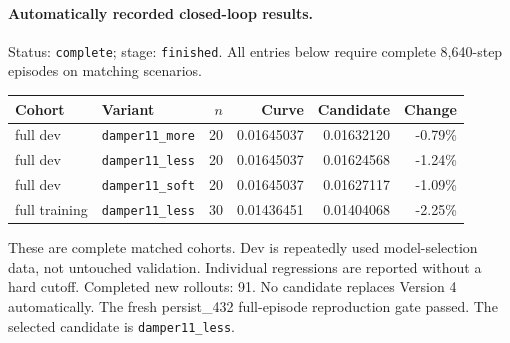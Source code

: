 \paragraph{Automatically recorded closed-loop results.}
Status: \texttt{complete}; stage: \texttt{finished}.
All entries below require complete 8,640-step episodes on matching scenarios.
\begin{center}\small
\begin{tabular}{llrrrr}\toprule
Cohort & Variant & $n$ & Curve & Candidate & Change \\\midrule
full dev & \texttt{damper11\_more} & 20 & 0.01645037 & 0.01632120 & -0.79\% \\
full dev & \texttt{damper11\_less} & 20 & 0.01645037 & 0.01624568 & -1.24\% \\
full dev & \texttt{damper11\_soft} & 20 & 0.01645037 & 0.01627117 & -1.09\% \\
full training & \texttt{damper11\_less} & 30 & 0.01436451 & 0.01404068 & -2.25\% \\
\bottomrule\end{tabular}\end{center}
These are complete matched cohorts. Dev is repeatedly used model-selection data, not untouched validation. Individual regressions are reported without a hard cutoff.
Completed new rollouts: 91. No candidate replaces Version 4 automatically.
The fresh persist\_432 full-episode reproduction gate passed.
The selected candidate is \texttt{damper11\_less}.
